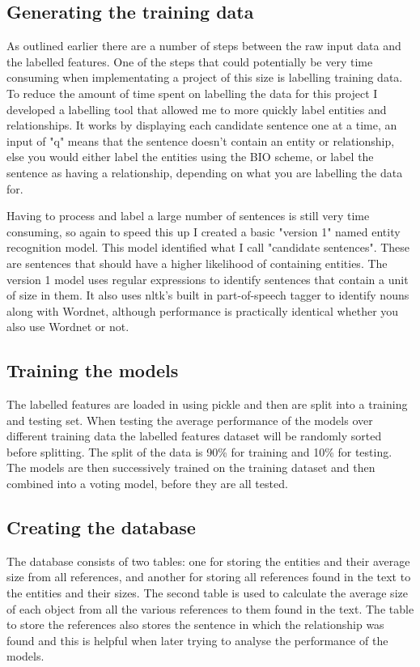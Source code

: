 \documentclass[11pt,oneside]{book}
\begin{document}
\subsection{Generating the training data}

As outlined earlier there are a number of steps between the raw input data and the labelled features. One of the steps that could potentially be very time consuming when implementating a project of this size is labelling training data. To reduce the amount of time spent on labelling the data for this project I developed a labelling tool that allowed me to more quickly label entities and relationships. It works by displaying each candidate sentence one at a time, an input of "q" means that the sentence doesn't contain an entity or relationship, else you would either label the entities using the BIO scheme, or label the sentence as having a relationship, depending on what you are labelling the data for.

Having to process and label a large number of sentences is still very time consuming, so again to speed this up I created a basic "version 1" named entity recognition model. This model identified what I call "candidate sentences". These are sentences that should have a higher likelihood of containing entities. The version 1 model uses regular expressions to identify sentences that contain a unit of size in them. It also uses nltk's built in part-of-speech tagger to identify nouns along with Wordnet, although performance is practically identical whether you also use Wordnet or not.

\subsection{Training the models}
The labelled features are loaded in using pickle and then are split into a training and testing set. When testing the average performance of the models over different training data the labelled features dataset will be randomly sorted before splitting. The split of the data is 90\% for training and 10\% for testing. The models are then successively trained on the training dataset and then combined into a voting model, before they are all tested.

\subsection{Creating the database}
The database consists of two tables: one for storing the entities and their average size from all references, and another for storing all references found in the text to the entities and their sizes. The second table is used to calculate the average size of each object from all the various references to them found in the text. The table to store the references also stores the sentence in which the relationship was found and this is helpful when later trying to analyse the performance of the models.
\end{document}

